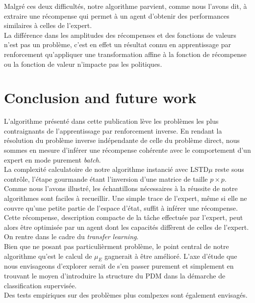 \documentclass[publibook-draft]{CAp2012}
\begin{document}
Malgré ces deux difficultés, notre algorithme parvient, comme nous l'avons dit, à extraire une récompense qui permet à un agent d'obtenir des performances similaires à celles de l'expert.\\

La différence dans les amplitudes des récompenses et des fonctions de valeurs n'est pas un problème, c'est en effet un résultat connu en apprentissage par renforcement qu'appliquer une transformation affine à la fonction de récompense ou la fonction de valeur n'impacte pas les politiques.
\section{Conclusion and future work}

L'algorithme présenté dans cette publication lève les problèmes les plus contraignants de l'apprentissage par renforcement inverse. En rendant la résolution du problème inverse indépendante de celle du problème direct, nous sommes en mesure d'inférer une récompense cohérente avec le comportement d'un expert en mode purement \emph{batch}.\\

La complexité calculatoire de notre algorithme instancié avec LSTD$\mu$ reste sous contrôle, l'étape gourmande étant l'inversion d'une matrice de taille $p \times p$.\\

Comme nous l'avons illustré, les échantillons nécessaires à la réussite de notre algorithmes sont faciles à recueillir. Une simple trace de l'expert, même si elle ne couvre qu'une petite partie de l'espace d'état, suffit à inférer une récompense. Cette récompense, description compacte de la tâche effectuée par l'expert, peut alors être optimisée par un agent dont les capacités diffèrent de celles de l'expert. On rentre dans le cadre du \emph{transfer learning}.\\

Bien que ne posant pas particulièrment problème, le point central de notre algorithme qu'est le calcul de $\mu_E$ gagnerait à être amélioré. L'axe d'étude que nous envisageons d'explorer serait de s'en passer purement et simplement en trouvant le moyen d'introduire la structure du PDM dans la démarche de classification supervisée.\\

Des tests empiriques sur des problèmes plus comlpexes sont également envisagés.
%
%

\end{document}
